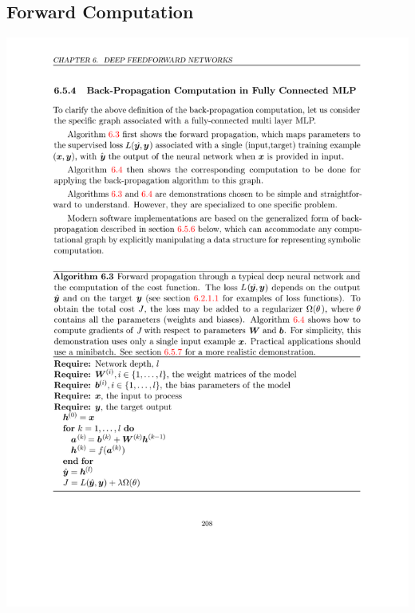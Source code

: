 \documentclass[12pt, a4paper]{article}
\begin{document}
\subsection{Forward Computation}
\includegraphics[width=\textwidth]{../imgs/Forward_Computation_of_MLP.pdf}
\end{document}
